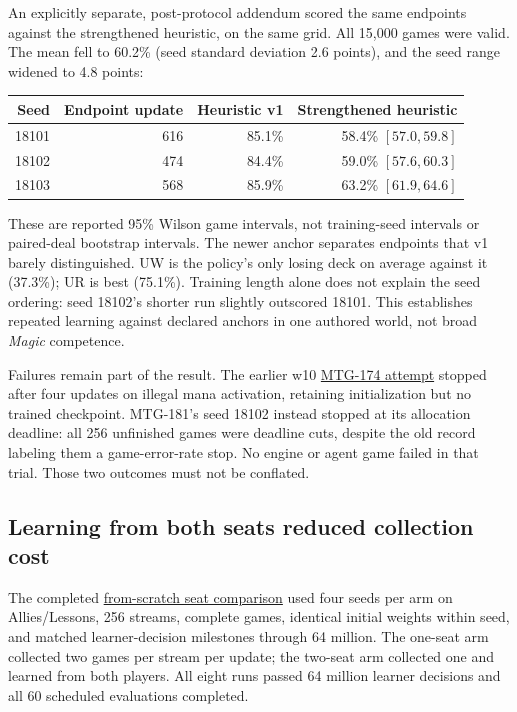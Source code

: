 \documentclass[11pt]{article}
\newcommand{\source}[2]{\href{https://github.com/loopflowstudio/manabot/blob/558e0186b585228dd2130cf14d9cb40de217e66f/#1}{#2}}
\newcommand{\report}[2]{\source{experiments/#1}{#2}}
\begin{document}
An explicitly separate, post-protocol addendum scored the same endpoints against the strengthened heuristic, on the same grid. All 15,000 games were valid. The mean fell to 60.2\% (seed standard deviation 2.6 points), and the seed range widened to 4.8 points:

\begin{center}
\begin{tabular}{rrrr}
\toprule
Seed & Endpoint update & Heuristic v1 & Strengthened heuristic \\
\midrule
18101 & 616 & 85.1\% & 58.4\% $[57.0,59.8]$ \\
18102 & 474 & 84.4\% & 59.0\% $[57.6,60.3]$ \\
18103 & 568 & 85.9\% & 63.2\% $[61.9,64.6]$ \\
\bottomrule
\end{tabular}
\end{center}

These are reported 95\% Wilson game intervals, not training-seed intervals or paired-deal bootstrap intervals. The newer anchor separates endpoints that v1 barely distinguished. UW is the policy's only losing deck on average against it (37.3\%); UR is best (75.1\%). Training length alone does not explain the seed ordering: seed 18102's shorter run slightly outscored 18101. This establishes repeated learning against declared anchors in one authored world, not broad \textit{Magic} competence.

Failures remain part of the result. The earlier w10 \report{elemental-uniform-baseline.md}{MTG-174 attempt} stopped after four updates on illegal mana activation, retaining initialization but no trained checkpoint. MTG-181's seed 18102 instead stopped at its allocation deadline: all 256 unfinished games were deadline cuts, despite the old record labeling them a game-error-rate stop. No engine or agent game failed in that trial. Those two outcomes must not be conflated.

\subsection{Learning from both seats reduced collection cost}

The completed \report{protocols/seat-comparison-v1.md}{from-scratch seat comparison} used four seeds per arm on Allies/Lessons, 256 streams, complete games, identical initial weights within seed, and matched learner-decision milestones through 64 million. The one-seat arm collected two games per stream per update; the two-seat arm collected one and learned from both players. All eight runs passed 64 million learner decisions and all 60 scheduled evaluations completed.
\end{document}
